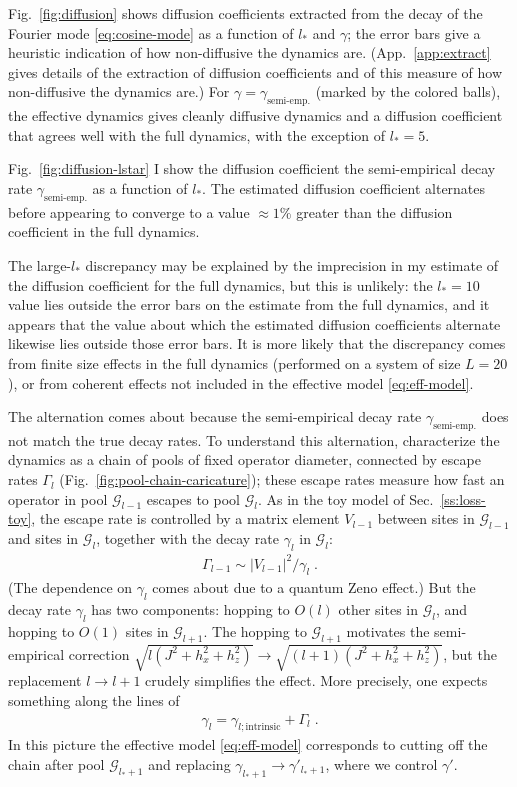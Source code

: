 \documentclass[aps,prb,nofootinbib,twocolumn,balancelastpage,amsmath,amssymb,floatfix,superscriptaddress,]{revtex4-1}
\newcommand{\pool}{\mathcal G}
\newcommand{\semiemp}{\text{semi-emp.}}
\begin{document}
{Fig.~\ref{fig:diffusion} shows diffusion coefficients extracted from the decay of the Fourier mode \eqref{eq:cosine-mode}
as a function of $l_*$ and $\gamma$;
the error bars give a heuristic indication of how non-diffusive the dynamics are.
(App.~\ref{app:extract} gives details of the extraction of diffusion coefficients
and of this measure of how non-diffusive the dynamics are.)
For $\gamma = \gamma_{\semiemp}$ (marked by the colored balls),
the effective dynamics gives cleanly diffusive dynamics and a diffusion coefficient that agrees well with the full dynamics,
with the exception of $l_* = 5$.

Fig.~\ref{fig:diffusion-lstar} I show the diffusion coefficient the semi-empirical decay rate $\gamma_{\semiemp}$ as a function of $l_*$.
The estimated diffusion coefficient alternates before appearing to converge to a value $\approx 1 \%$ greater than the diffusion coefficient in the full dynamics.


The large-$l_*$ discrepancy may be explained by the imprecision in my estimate of the diffusion coefficient for the full dynamics,
but this is unlikely:
the $l_* = 10$ value lies outside the error bars on the estimate from the full dynamics,
and it appears that the value about which the estimated diffusion coefficients alternate likewise lies outside those error bars.
It is more likely that the discrepancy comes from finite size effects in the full dynamics (performed on a system of size $L = 20$), or from coherent effects not included in the effective model \eqref{eq:eff-model}.


The alternation comes about because the semi-empirical decay rate $\gamma_{\semiemp}$ does not match the true decay rates.
To understand this alternation,
characterize the dynamics as a chain of pools of fixed operator diameter, connected by escape rates $\Gamma_l$ (Fig.~\ref{fig:pool-chain-caricature});
these escape rates measure how fast an operator in pool $\pool_{l-1}$ escapes to pool $\pool_{l}$.
As in the toy model of Sec.~\ref{ss:loss-toy},
the escape rate is controlled by a matrix element $V_{l-1}$ between sites in $\pool_{l-1}$ and sites in $\pool_{l}$,
together with the decay rate $\gamma_{l}$ in $\pool_{l}$:
\begin{align}
  \Gamma_{l-1} \sim |V_{l-1}|^2 / \gamma_{l}\;.
\end{align}
(The dependence on $\gamma_{l}$ comes about due to a quantum Zeno effect.)
But the decay rate $\gamma_{l}$ has two components:
hopping to $O(l)$ other sites in $\pool_{l}$,
and hopping to $O(1)$ sites in $\pool_{l+1}$.
The hopping to $\pool_{l+1}$ motivates the semi-empirical correction $\sqrt{l(J^2 + h_x^2 + h_z^2)} \to\sqrt{(l+1)(J^2 + h_x^2 + h_z^2)}$,
but the replacement $l \to l+1$ crudely simplifies the effect.
More precisely, one expects something along the lines of
\begin{align}
  \gamma_l = \gamma_{l;\text{intrinsic} } + \Gamma_{l}\;.
\end{align}
In this picture the effective model \eqref{eq:eff-model} corresponds to cutting off the chain after pool $\pool_{l_*+1}$
and replacing $\gamma_{l_*+1} \to \gamma'_{l_*+1}$,
where we control $\gamma'$.

}
\end{document}
